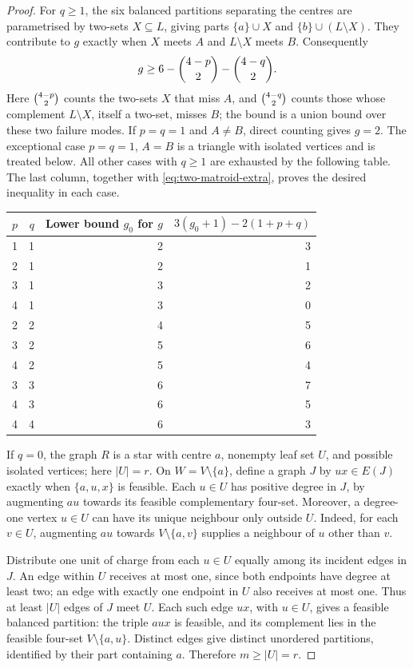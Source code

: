 \begin{proof}
For $q\ge1$, the six balanced partitions separating the centres are
parametrised by two-sets $X\subseteq L$, giving parts $\{a\}\cup X$ and
$\{b\}\cup(L\setminus X)$. They contribute to $g$ exactly when $X$ meets
$A$ and $L\setminus X$ meets $B$. Consequently
\[
g\ge6-\binom{4-p}{2}-\binom{4-q}{2}.
\]
Here $\binom{4-p}{2}$ counts the two-sets $X$ that miss $A$, and
$\binom{4-q}{2}$ counts those whose complement $L\setminus X$, itself a
two-set, misses $B$; the bound is a union bound over these two failure modes.
If $p=q=1$ and $A\ne B$, direct counting gives $g=2$. The exceptional
case $p=q=1$, $A=B$ is a triangle with isolated vertices and is treated
below. All other cases with $q\ge1$ are exhausted by the following table.
The last column, together with \eqref{eq:two-matroid-extra}, proves the
desired inequality in each case.
\begin{center}
\begin{tabular}{rrrr}
\toprule
$p$ & $q$ & Lower bound $g_0$ for $g$ & $3(g_0+1)-2(1+p+q)$\\
\midrule
1 & 1 & 2 & 3\\
2 & 1 & 2 & 1\\
3 & 1 & 3 & 2\\
4 & 1 & 3 & 0\\
2 & 2 & 4 & 5\\
3 & 2 & 5 & 6\\
4 & 2 & 5 & 4\\
3 & 3 & 6 & 7\\
4 & 3 & 6 & 5\\
4 & 4 & 6 & 3\\
\bottomrule
\end{tabular}
\end{center}

If $q=0$, the graph $R$ is a star with centre $a$, nonempty leaf set $U$,
and possible isolated vertices; here $|U|=r$. On $W=V\setminus\{a\}$,
define a graph $J$ by $ux\in E(J)$ exactly when $\{a,u,x\}$ is feasible.
Each $u\in U$ has positive degree in $J$, by augmenting $au$ towards its
feasible complementary four-set. Moreover, a degree-one vertex $u\in U$
can have its unique neighbour only outside $U$. Indeed, for each $v\in U$,
augmenting $au$ towards $V\setminus\{a,v\}$ supplies a neighbour of $u$
other than $v$.

Distribute one unit of charge from each $u\in U$ equally among its incident
edges in $J$. An edge within $U$ receives at most one, since both endpoints
have degree at least two; an edge with exactly one endpoint in $U$ also
receives at most one. Thus at least $|U|$ edges of $J$ meet $U$. Each such
edge $ux$, with $u\in U$, gives a feasible balanced partition: the triple
$aux$ is feasible, and its complement lies in the feasible four-set
$V\setminus\{a,u\}$. Distinct edges give distinct unordered partitions,
identified by their part containing $a$. Therefore $m\ge|U|=r$.


\end{proof}

